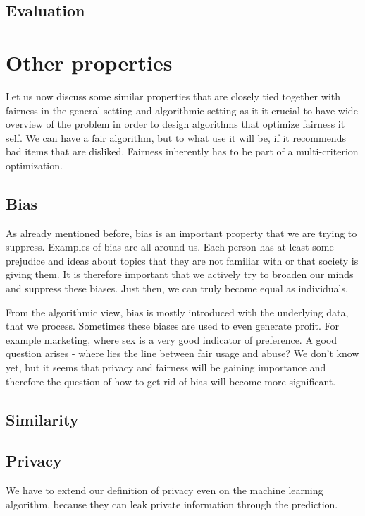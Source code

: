 \subsection{Evaluation} \label{sec:02_evaluation}

\section{Other properties} \label{sec:02_other_properties}
Let us now discuss some similar properties that are closely tied together with fairness in the general setting and algorithmic setting as it it crucial to have wide overview of the problem in order to design algorithms that optimize fairness it self. We can have a fair algorithm, but to what use it will be, if it recommends bad items that are disliked. Fairness inherently has to be part of a multi-criterion optimization.

\subsection{Bias}
As already mentioned before, bias is an important property that we are trying to suppress. Examples of bias are all around us. Each person has at least some prejudice and ideas about topics that they are not familiar with or that society is giving them. It is therefore important that we actively try to broaden our minds and suppress these biases. Just then, we can truly become equal as individuals.

From the algorithmic view, bias is mostly introduced with the underlying data, that we process. Sometimes these biases are used to even generate profit. For example marketing, where sex is a very good indicator of preference. A good question arises - where lies the line between fair usage and abuse? We don't know yet, but it seems that privacy and fairness will be gaining importance and therefore the question of how to get rid of bias will become more significant.


\subsection{Similarity}


\subsection{Privacy}
We have to extend our definition of privacy even on the machine learning algorithm, because they can leak private information through the prediction. 
